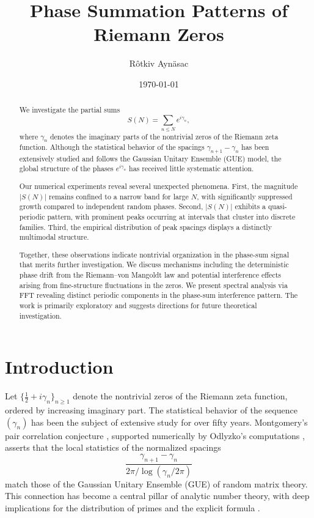 \documentclass[11pt]{amsart}
\title{Phase Summation Patterns of Riemann Zeros}
\author{Rôtkiv Aynäsac}
\date{\today}
\begin{document}
\maketitle

\tableofcontents

\begin{abstract}
We investigate the partial sums 
\[
S(N)=\sum_{n\le N} e^{i\gamma_n},
\] 
where $\gamma_n$ denotes the imaginary parts of the nontrivial zeros of the Riemann zeta function. 
Although the statistical behavior of the spacings $\gamma_{n+1}-\gamma_n$ has been extensively studied and follows the Gaussian Unitary Ensemble (GUE) model, the global structure of the phases $e^{i\gamma_n}$ has received little systematic attention.

Our numerical experiments reveal several unexpected phenomena. 
First, the magnitude $|S(N)|$ remains confined to a narrow band for large $N$, with significantly suppressed growth compared to independent random phases. 
Second, $|S(N)|$ exhibits a quasi-periodic pattern, with prominent peaks occurring at intervals that cluster into discrete families. 
Third, the empirical distribution of peak spacings displays a distinctly multimodal structure. 

Together, these observations indicate nontrivial organization in the phase-sum
signal that merits further investigation. 
We discuss mechanisms including the deterministic phase drift from the Riemann--von Mangoldt law and potential interference effects arising from fine-structure fluctuations in the zeros. 
We present spectral analysis via FFT revealing distinct periodic components in the phase-sum interference pattern. 
The work is primarily exploratory and suggests directions for future theoretical investigation.
\end{abstract}


\section*{Introduction}

Let $\{\tfrac12+i\gamma_n\}_{n\ge1}$ denote the nontrivial zeros of the Riemann zeta function, ordered by increasing imaginary part.  
The statistical behavior of the sequence $(\gamma_n)$ has been the subject of extensive study for over fifty years.  
Montgomery's pair correlation conjecture \cite{Montgomery1973}, supported numerically by Odlyzko's computations \cite{Odlyzko1987,Odlyzko2001}, asserts that the local statistics of the normalized spacings
\[
\frac{\gamma_{n+1}-\gamma_n}{2\pi/\log(\gamma_n/2\pi)}
\]
match those of the Gaussian Unitary Ensemble (GUE) of random matrix theory.  
This connection has become a central pillar of analytic number theory, with deep implications for the distribution of primes and the explicit formula \cite{BerryKeating1999,Hejhal1994,ConreyGonek2001}.  
\end{document}
